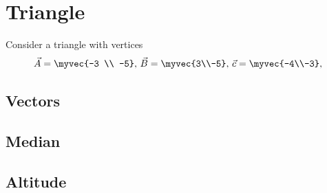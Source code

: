 \documentclass[11pt]{book}
\begin{document}
\frontmatter
\tableofcontents
\setcounter{page}{1}
\mainmatter
\chapter{Triangle}
Consider a triangle with vertices
\begin{align}
\label{eq:tri-pts}
\vec{A}=\myvec{-3 \\ -5},\,
\vec{B}=\myvec{3\\-5},\,
	\vec{c}=\myvec{-4\\-3},\,
\end{align}

\section{Vectors}
\section{Median}
\section{Altitude}
\end{document}
